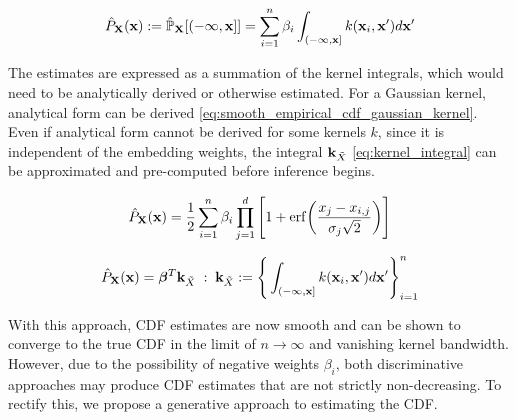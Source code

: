 \documentclass[twoside]{article} \usepackage{aistats2017}
\theoremstyle{definition}
\newcommand{\rv}[1]{{#1}}
\newcommand{\ds}[1]{\tilde{#1}}
\begin{document}
		\begin{equation}
			\hat{P}_{\bvec{\rv{X}}}(\bvec{x}) := \hat{\mathbb{P}}_{\bvec{\rv{X}}}[(-\bvec{\infty}, \bvec{x}]] = \sum_{i = 1}^{n} \beta_{i} \int_{(-\bvec{\infty}, \bvec{x}]}  k(\bvec{x}_{i}, \bvec{x}') d\bvec{x}'
		\label{eq:smooth_empirical_cdf}
		\end{equation}
		
		The estimates are expressed as a summation of the kernel integrals, which would need to be analytically derived or otherwise estimated. For a Gaussian kernel, analytical form can be derived \eqref{eq:smooth_empirical_cdf_gaussian_kernel}. Even if analytical form cannot be derived for some kernels $k$, since it is independent of the embedding weights, the integral $\bvec{k}_{\ds{X}}$ \eqref{eq:kernel_integral} can be approximated and pre-computed before inference begins.

		\begin{equation}
			\hat{P}_{\bvec{\rv{X}}}(\bvec{x}) = \frac{1}{2} \sum_{i = 1}^{n} \beta_{i} \prod_{j = 1}^{d} \Bigg[1 + \mathrm{erf}\bigg(\frac{x_{j} - x_{i, j}}{\sigma_{j} \sqrt{2}}\bigg)\Bigg]
		\label{eq:smooth_empirical_cdf_gaussian_kernel}
		\end{equation}

		\begin{equation}
			\hat{P}_{\bvec{\rv{X}}}(\bvec{x}) = \bm{\beta}^{T} \bvec{k}_{\ds{X}} \; : \; \bvec{k}_{\ds{X}} := \Bigg\{ \int_{(-\bvec{\infty}, \bvec{x}]}  k(\bvec{x}_{i}, \bvec{x}') d\bvec{x}' \Bigg\}_{i = 1}^{n}
		\label{eq:kernel_integral}
		\end{equation}
			
		With this approach, CDF estimates are now smooth and can be shown to converge to the true CDF in the limit of $n \rightarrow \infty$ and vanishing kernel bandwidth. However, due to the possibility of negative weights $\beta_{i}$, both discriminative approaches may produce CDF estimates that are not strictly non-decreasing. To rectify this, we propose a generative approach to estimating the CDF.
\end{document}
